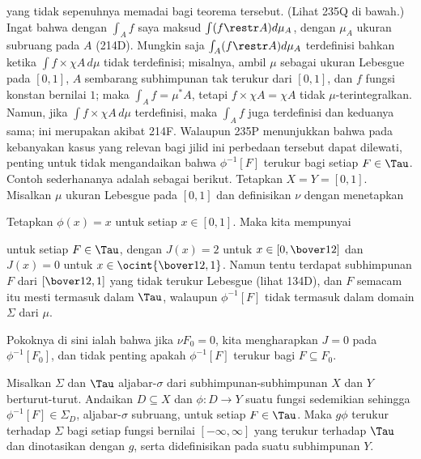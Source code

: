 {\noindent yang tidak sepenuhnya memadai bagi teorema tersebut. (Lihat
235Q di bawah.) Ingat bahwa dengan $\int_Af$ saya maksud
$\int(f\restr A)d\mu_A$, dengan $\mu_A$ ukuran subruang pada $A$ (214D).
Mungkin saja $\int_A(f\restr A)d\mu_A$ terdefinisi bahkan ketika
$\int f\times\chi A\,d\mu$ tidak terdefinisi; misalnya, ambil $\mu$
sebagai ukuran Lebesgue pada $[0,1]$, $A$ sembarang subhimpunan tak
terukur dari $[0,1]$, dan $f$ fungsi konstan bernilai $1$; maka
$\int_Af=\mu^*A$, tetapi $f\times\chi A=\chi A$ tidak
$\mu$-terintegralkan. Namun, jika $\int f\times\chi A\,d\mu$
terdefinisi, maka $\int_Af$ juga terdefinisi dan keduanya sama; ini
merupakan akibat 214F. Walaupun 235P menunjukkan bahwa pada kebanyakan
kasus yang relevan bagi jilid ini perbedaan tersebut dapat dilewati,
penting untuk tidak mengandaikan bahwa $\phi^{-1}[F]$ terukur bagi setiap
$F\in\Tau$. Contoh sederhananya adalah sebagai berikut. Tetapkan
$X=Y=[0,1]$. Misalkan $\mu$ ukuran Lebesgue pada $[0,1]$ dan definisikan
$\nu$ dengan menetapkan



\noindent Tetapkan $\phi(x)=x$ untuk setiap $x\in[0,1]$. Maka kita
mempunyai


\noindent untuk setiap $F\in\Tau$, dengan $J(x)=2$ untuk
$x\in[0,\bover12]$ dan $J(x)=0$ untuk
$x\in\ocint{\bover12,1}$. Namun tentu terdapat subhimpunan $F$ dari
$[\bover12,1]$ yang tidak terukur Lebesgue (lihat 134D), dan $F$ semacam
itu mesti termasuk dalam $\Tau$, walaupun $\phi^{-1}[F]$ tidak termasuk
dalam domain $\Sigma$ dari $\mu$.

Pokoknya di sini ialah bahwa jika $\nu F_0=0$, kita mengharapkan
$J=0$ pada $\phi^{-1}[F_0]$, dan tidak penting apakah
$\phi^{-1}[F]$ terukur bagi $F\subseteq F_0$.
}%

 Misalkan $\Sigma$ dan $\Tau$ aljabar-$\sigma$ dari
subhimpunan-subhimpunan $X$ dan $Y$ berturut-turut. Andaikan
$D\subseteq X$ dan $\phi:D\to Y$ suatu fungsi sedemikian sehingga
$\phi^{-1}[F]\in\Sigma_D$, aljabar-$\sigma$ subruang, untuk setiap
$F\in\Tau$. Maka $g\phi$ terukur terhadap $\Sigma$ bagi setiap fungsi
bernilai $[-\infty,\infty]$ yang terukur terhadap $\Tau$ dan dinotasikan
dengan $g$, serta didefinisikan pada suatu subhimpunan $Y$.

